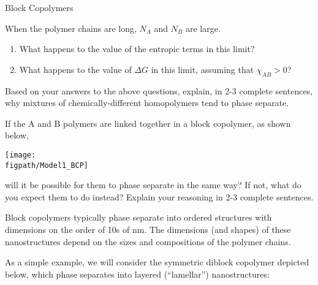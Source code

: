 \begin{activity}[extension]{Block Copolymers}
\begin{ctqs}
	\question When the polymer chains are long, $N_A$ and $N_B$ are large.  
	
		\begin{enumerate}
			\item What happens to the value of the entropic terms in this limit?
	
			\begin{solution}[1in]
			\end{solution}
	
			\item What happens to the value of $\Delta G$ in this limit, assuming that $\chi_{AB}>0$?
	
			\begin{solution}[1in]
			\end{solution}
		
		\end{enumerate}
	
	\question Based on your answers to the above questions, explain, in 2-3 complete sentences, why mixtures of chemically-different homopolymers tend to phase separate.
	
			\begin{solution}[1.5in]
			\end{solution}
	
	\question If the A and B polymers are linked together in a block copolymer, as shown below,
	
	\vspace{6pt}
	\centerline{\texttt{[image: \\figpath/Model1\_BCP]}}
	
		will it be possible for them to phase separate in the same way?  If not, what do you expect them to do instead?  Explain your reasoning in 2-3 complete sentences.
	
			\begin{solution}[1.5in]
			\end{solution}
		
\end{ctqs}
	
	
\begin{model}
\label{\labelbase:mdl:BCPs}

Block copolymers typically phase separate into ordered structures with dimensions on the order of 10s of nm.  The dimensions (and shapes) of these nanostructures depend on the sizes and compositions of the polymer chains.

As a simple example, we will consider the symmetric diblock copolymer depicted below, which phase separates into layered (``lamellar'') nanostructures:
	

\end{model}
\end{activity}
